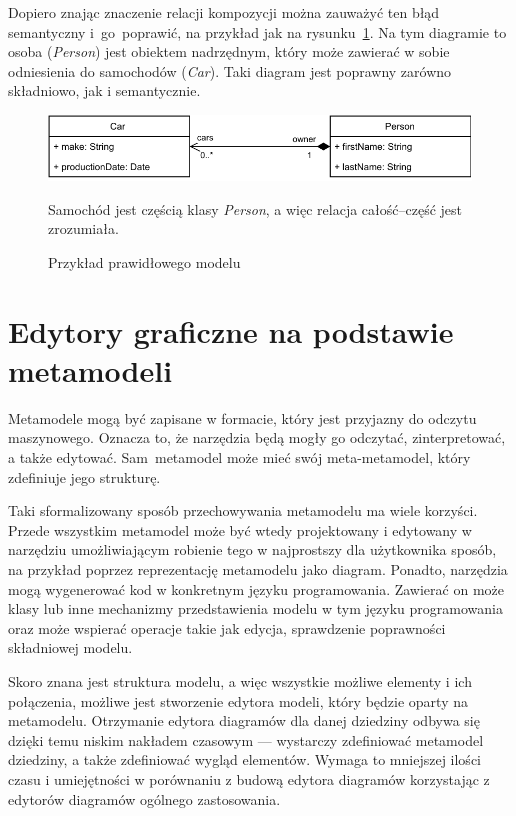 Dopiero znając znaczenie relacji kompozycji można zauważyć ten błąd semantyczny
i~go~poprawić, na przykład jak na rysunku~\ref{rys:prawidlowy-model-uml}. Na
tym diagramie to osoba (\emph{Person}) jest obiektem nadrzędnym, który może
zawierać w sobie odniesienia do samochodów (\emph{Car}). Taki diagram jest
poprawny zarówno składniowo, jak i semantycznie.

\begin{figure}[!hb]
	\centering

	\includegraphics[width=0.95\linewidth]{./images/valid-uml-example.pdf}
	\caption{Przykład prawidłowego modelu
		}\label{rys:prawidlowy-model-uml}
	\medskip
	{\small Samochód jest częścią klasy \emph{Person}, a więc relacja
		całość--część jest zrozumiała.}
\end{figure}

\section{Edytory graficzne na podstawie metamodeli}

Metamodele mogą być zapisane w formacie, który jest przyjazny do odczytu
maszynowego. Oznacza to, że narzędzia będą mogły go odczytać, zinterpretować, a
także edytować. Sam~metamodel może mieć swój meta-metamodel, który zdefiniuje
jego strukturę.

Taki sformalizowany sposób przechowywania metamodelu ma wiele
korzyści. Przede wszystkim metamodel może być wtedy projektowany i edytowany w
narzędziu umożliwiającym robienie tego w najprostszy dla użytkownika sposób, na
przykład poprzez reprezentację metamodelu jako diagram. Ponadto, narzędzia mogą
wygenerować kod w konkretnym języku programowania. Zawierać on może klasy lub
inne mechanizmy przedstawienia modelu w tym języku programowania oraz może
wspierać operacje takie jak edycja, sprawdzenie poprawności składniowej
modelu.

Skoro znana jest struktura modelu, a więc wszystkie możliwe elementy i ich
połączenia, możliwe jest stworzenie edytora modeli, który będzie oparty na
metamodelu. Otrzymanie edytora diagramów dla danej dziedziny odbywa się dzięki
temu niskim nakładem czasowym --- wystarczy zdefiniować metamodel dziedziny, a
także zdefiniować wygląd elementów. Wymaga to mniejszej ilości czasu i
umiejętności w porównaniu z budową edytora diagramów korzystając z
edytorów diagramów ogólnego zastosowania.

